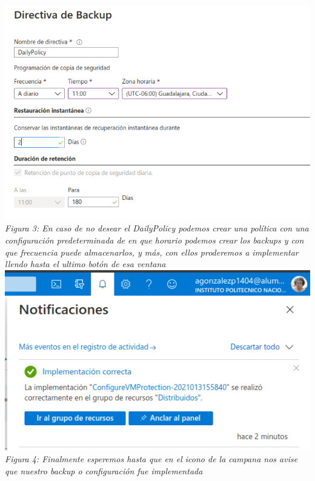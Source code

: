 \documentclass[10pt,executivepaper]{article}
\begin{document}
\begin{center}
  \includegraphics[scale=0.5]{imgs/3.png}\\
  \textit{Figura 3: En caso de no desear el DailyPolicy podemos crear una política con una configuración predeterminada de en que horario podemos crear los backups y con que frecuencia puede almacenarlos, y más, con ellos proderemos a implementar llendo hasta el ultimo botón de esa ventana}\\
  \includegraphics[scale=0.5]{imgs/4.png}\\
  \textit{Figura 4: Finalmente esperemos hasta que en el icono de la campana nos avise que nuestro backup o configuración fue implementada}
\end{center}
\end{document}
